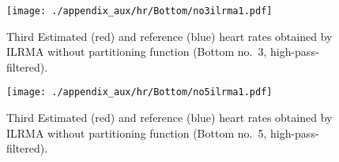 \begin{figure}[tb]
\centering
\texttt{[image: ./appendix\_aux/hr/Bottom/no3ilrma1.pdf]}
\caption{Third Estimated (red) and reference (blue) heart rates obtained by ILRMA without partitioning function (Bottom no.~3, high-pass-filtered).}
\end{figure}

\begin{figure}[tb]
\centering
\texttt{[image: ./appendix\_aux/hr/Bottom/no5ilrma1.pdf]}
\caption{Third Estimated (red) and reference (blue) heart rates obtained by ILRMA without partitioning function (Bottom no.~5, high-pass-filtered).}
\end{figure}
